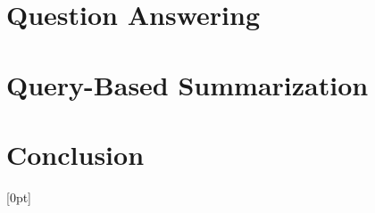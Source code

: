\documentclass[sigconf]{acmart}
\begin{document}
\section{Question Answering}
\label{sec:qa}


\section{Query-Based Summarization}
\label{sec:summ}


\vspace{-0.1in}
\section{Conclusion}
\label{sec:conclusion}



% 









\clearpage %
\appendix

[0pt]                                               %
  {\addvspace{8pt}\bfseries}                                               %
  {\makebox[1.5em][l]{\thecontentslabel}}                                  %
  {}                                                                       %
  {\contentspage}                                     %
\end{document}
